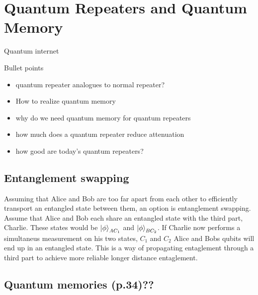 \section{Quantum Repeaters and Quantum Memory}
Quantum internet \cite{Azuma:2023}
\begin{mybox}{Bullet points}
    \begin{itemize}
        \item quantum repeater analogues to normal repeater?
        \item How to realize quantum memory 
        \item why do we need quantum memory for quantum repeaters
        \item how much does a quantum repeater reduce attenuation
        \item how good are today's quantum repeaters? 
    \end{itemize}
\end{mybox}

\subsection{Entanglement swapping}

Assuming that Alice and Bob are too far apart from each other to efficiently transport an entangled state between them,
an option is entanglement swapping. Assume that Alice and Bob each share an entangled state with the third part, Charlie.
These states would be $\ket{\phi}_{AC_1}$ and $\ket{\phi}_{BC_2}$. If Charlie now performs a simultaneus measurement on his two states, $C_1$ and $C_2$
Alice and Bobs qubits will end up in an entangled state. This is a way of propagating entaglement through a third part to achieve more reliable longer distance entaglement.

\subsection{Quantum memories (p.34)??}
